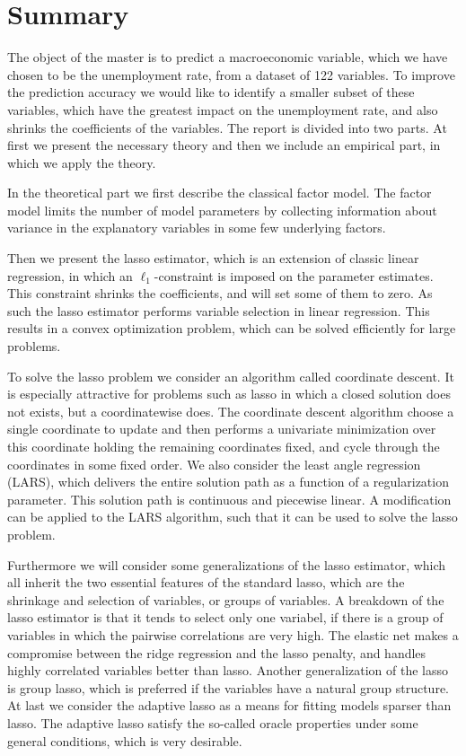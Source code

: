 \chapter{Summary}
%
The object of the master is to predict a macroeconomic variable, which we have chosen to be the unemployment rate, from a dataset of 122 variables.
To improve the prediction accuracy we would like to identify a smaller subset of these variables, which have the greatest impact on the unemployment rate, and also shrinks the coefficients of the variables.
The report is divided into two parts. 
At first we present the necessary theory and then we include an empirical part, in which we apply the theory.

In the theoretical part we first describe the classical factor model.
The factor model limits the number of model parameters by collecting information about variance in the explanatory variables in some few underlying factors.

Then we present the lasso estimator, which is an extension of classic linear regression, in which an \(\ell_1\)-constraint is imposed on the parameter estimates.
This constraint shrinks the coefficients, and will set some of them to zero.
As such the lasso estimator performs variable selection in linear regression.
This results in a convex optimization problem, which can be solved efficiently for large problems.

To solve the lasso problem we consider an algorithm called coordinate descent.
It is especially attractive for problems such as lasso in which a closed solution does not exists, but a coordinatewise does.
The coordinate descent algorithm choose a single coordinate to update and then performs a univariate minimization over this coordinate holding the remaining coordinates fixed, and cycle through the coordinates in some fixed order.
We also consider the least angle regression (LARS), which delivers the entire solution path as a function of a regularization parameter.
This solution path is continuous and piecewise linear.
A modification can be applied to the LARS algorithm, such that it can be used to solve the lasso problem.

Furthermore we will consider some generalizations of the lasso estimator, which all inherit the two essential features of the standard lasso, which are the shrinkage and selection of variables, or groups of variables.
A breakdown of the lasso estimator is that it tends to select only one variabel, if there is a group of variables in which the pairwise correlations are very high.
The elastic net makes a compromise between the ridge regression and the lasso penalty, and handles highly correlated variables better than lasso. 
Another generalization of the lasso is group lasso, which is preferred if the variables have a natural group structure.
At last we consider the adaptive lasso as a means for fitting models sparser than lasso.
The adaptive lasso satisfy the so-called oracle properties under some general conditions, which is very desirable. 

